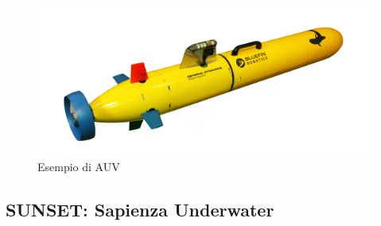 \documentclass[Lau,binding=0.6cm]{sapthesis}
\begin{document}
\begin{figure}[H]
    \centering
	\includegraphics[width=\linewidth]{auv.png}
	\caption{ Esempio di AUV}
	\label{fig:}
\end{figure}

\subsection{SUNSET: Sapienza Underwater }
\end{document}
